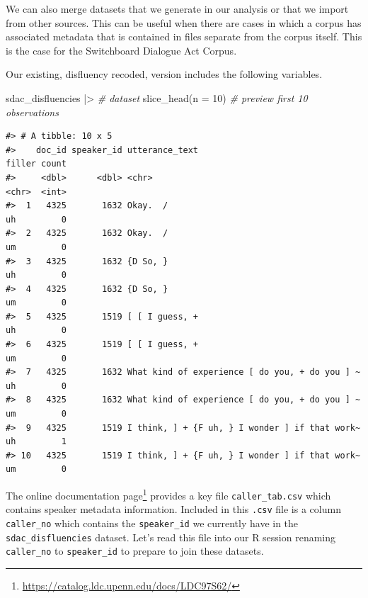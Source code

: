 \documentclass[
  letterpaper,
]{latex/krantz}
\newenvironment{Shaded}{\begin{snugshade}}{\end{snugshade}}
\newcommand{\AttributeTok}[1]{\textcolor[rgb]{0.00,0.00,0.00}{#1}}
\newcommand{\CommentTok}[1]{\textcolor[rgb]{0.00,0.00,0.00}{\textit{#1}}}
\newcommand{\DecValTok}[1]{\textcolor[rgb]{0.00,0.00,0.00}{#1}}
\newcommand{\FunctionTok}[1]{\textcolor[rgb]{0.00,0.00,0.00}{#1}}
\newcommand{\NormalTok}[1]{\textcolor[rgb]{0.00,0.00,0.00}{#1}}
\newcommand{\SpecialCharTok}[1]{\textcolor[rgb]{0.00,0.00,0.00}{#1}}
\DeclareRobustCommand{\href}[2]{#2\footnote{\url{#1}}}
\begin{document}
We can also merge datasets that we generate in our analysis or that we
import from other sources. This can be useful when there are cases in
which a corpus has associated metadata that is contained in files
separate from the corpus itself. This is the case for the Switchboard
Dialogue Act Corpus.

Our existing, disfluency recoded, version includes the following
variables.

\begin{Shaded}
\begin{Highlighting}[]
\NormalTok{sdac\_disfluencies }\SpecialCharTok{|\textgreater{}} \CommentTok{\# dataset}
  \FunctionTok{slice\_head}\NormalTok{(}\AttributeTok{n =} \DecValTok{10}\NormalTok{) }\CommentTok{\# preview first 10 observations}
\end{Highlighting}
\end{Shaded}

\begin{verbatim}
#> # A tibble: 10 x 5
#>    doc_id speaker_id utterance_text                                 filler count
#>     <dbl>      <dbl> <chr>                                          <chr>  <int>
#>  1   4325       1632 Okay.  /                                       uh         0
#>  2   4325       1632 Okay.  /                                       um         0
#>  3   4325       1632 {D So, }                                       uh         0
#>  4   4325       1632 {D So, }                                       um         0
#>  5   4325       1519 [ [ I guess, +                                 uh         0
#>  6   4325       1519 [ [ I guess, +                                 um         0
#>  7   4325       1632 What kind of experience [ do you, + do you ] ~ uh         0
#>  8   4325       1632 What kind of experience [ do you, + do you ] ~ um         0
#>  9   4325       1519 I think, ] + {F uh, } I wonder ] if that work~ uh         1
#> 10   4325       1519 I think, ] + {F uh, } I wonder ] if that work~ um         0
\end{verbatim}

The \href{https://catalog.ldc.upenn.edu/docs/LDC97S62/}{online
documentation page} provides a key file \texttt{caller\_tab.csv} which
contains speaker metadata information. Included in this \texttt{.csv}
file is a column \texttt{caller\_no} which contains the
\texttt{speaker\_id} we currently have in the
\texttt{sdac\_disfluencies} dataset. Let's read this file into our R
session renaming \texttt{caller\_no} to \texttt{speaker\_id} to prepare
to join these datasets.
\end{document}
